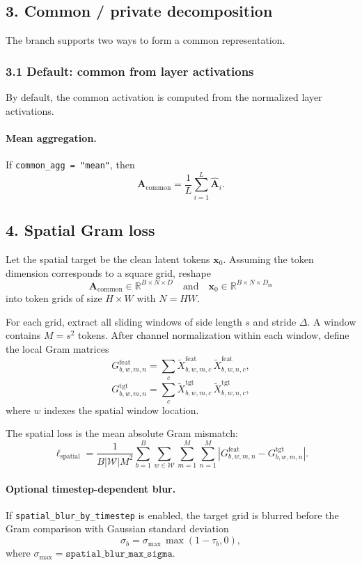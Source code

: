 \documentclass[11pt]{article}
\begin{document}
\subsection*{3. Common / private decomposition}
The branch supports two ways to form a common representation.

\subsubsection*{3.1 Default: common from layer activations}
By default, the common activation is computed from the normalized layer activations.

\paragraph{Mean aggregation.}
If \texttt{common\_agg = "mean"}, then
\[
  \bm{A}_{\mathrm{common}}
  =
  \frac{1}{L}\sum_{i=1}^{L}\hat{\bm{A}}_i.
\]

\subsection*{4. Spatial Gram loss}
Let the spatial target be the clean latent tokens $\bm{x}_0$. Assuming the token dimension corresponds to a square grid, reshape
\[
  \bm{A}_{\mathrm{common}} \in \mathbb{R}^{B\times N\times D}
  \quad \text{and} \quad
  \bm{x}_0 \in \mathbb{R}^{B\times N\times D_{\mathrm{in}}}
\]
into token grids of size $H\times W$ with $N=HW$.

For each grid, extract all sliding windows of side length $s$ and stride $\Delta$. A window contains $M=s^2$ tokens. After channel normalization within each window, define the local Gram matrices
\[
  G^{\mathrm{feat}}_{b,w,m,n}
  =
  \sum_{c}
  \tilde{X}^{\mathrm{feat}}_{b,w,m,c}\,
  \tilde{X}^{\mathrm{feat}}_{b,w,n,c},
\]
\[
  G^{\mathrm{tgt}}_{b,w,m,n}
  =
  \sum_{c}
  \tilde{X}^{\mathrm{tgt}}_{b,w,m,c}\,
  \tilde{X}^{\mathrm{tgt}}_{b,w,n,c},
\]
where $w$ indexes the spatial window location.

The spatial loss is the mean absolute Gram mismatch:
\[
  \ell_{\mathrm{spatial}}
  =
  \frac{1}{B|\mathcal{W}|M^2}
  \sum_{b=1}^{B}
  \sum_{w\in\mathcal{W}}
  \sum_{m=1}^{M}
  \sum_{n=1}^{M}
  \left|
    G^{\mathrm{feat}}_{b,w,m,n}
    -
    G^{\mathrm{tgt}}_{b,w,m,n}
  \right|.
\]

\paragraph{Optional timestep-dependent blur.}
If \texttt{spatial\_blur\_by\_timestep} is enabled, the target grid is blurred before the Gram comparison with Gaussian standard deviation
\[
  \sigma_b
  =
  \sigma_{\max}\,\max(1-\tau_b,0),
\]
where $\sigma_{\max} = \texttt{spatial\_blur\_max\_sigma}$.
\end{document}
